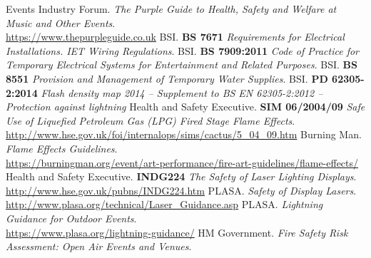 \addtocounter{subsection}{1}

\restoregeometry
\newpage
\begin{thebibliography}{18}
    Events Industry Forum.
    \textit{The Purple Guide to Health, Safety and Welfare at Music and Other Events}. \\
    \href{https://www.thepurpleguide.co.uk}{https://www.thepurpleguide.co.uk}
    BSI.
    \textbf{BS 7671} \textit{Requirements for Electrical Installations. IET Wiring Regulations}.
    BSI.
    \textbf{BS 7909:2011} \textit{Code of Practice for Temporary Electrical Systems for Entertainment and Related Purposes}.
    BSI.
    \textbf{BS 8551} \textit{Provision and Management of Temporary Water Supplies}.
    BSI.
    \textbf{PD 62305-2:2014} \textit{Flash density map 2014 – Supplement to BS EN 62305-2:2012 – Protection against lightning}
    Health and Safety Executive.
    \textbf{SIM 06/2004/09} \textit{Safe Use of Liquefied Petroleum Gas (LPG) Fired Stage Flame Effects}. \\
    \href{http://www.hse.gov.uk/foi/internalops/sims/cactus/5\_04\_09.htm}{http://www.hse.gov.uk/foi/internalops/sims/cactus/5\_04\_09.htm}
    Burning Man.
    \textit{Flame Effects Guidelines}. \\
    \href{https://burningman.org/event/art-performance/fire-art-guidelines/flame-effects/}{https://burningman.org/event/art-performance/fire-art-guidelines/flame-effects/}
    Health and Safety Executive.
    \textbf{INDG224} \textit{The Safety of Laser Lighting Displays}. \\
    \href{http://www.hse.gov.uk/pubns/INDG224.htm}{http://www.hse.gov.uk/pubns/INDG224.htm}
    PLASA.
    \textit{Safety of Display Lasers}. \\
    \href{http://www.plasa.org/technical/Laser\_Guidance.asp}{http://www.plasa.org/technical/Laser\_Guidance.asp}
    PLASA.
    \textit{Lightning Guidance for Outdoor Events}. \\
    \href{https://www.plasa.org/lightning-guidance/}{https://www.plasa.org/lightning-guidance/}
    HM Government.
    \textit{Fire Safety Risk Assessment: Open Air Events and Venues}. \\

\end{thebibliography}
